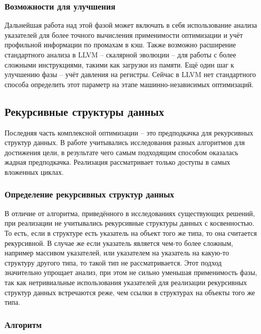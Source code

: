 \documentclass[12pt,a4paper,oneside]{article}
\begin{document}
\subsubsection{Возможности для улучшения}

\indent

Дальнейшая работа над этой фазой может включать в себя использование анализа указателей для более точного вычисления применимости оптимизации и учёт профильной информации по промахам в кэш. Также возможно расширение стандартного анализа в LLVM -- скалярной эволюции -- для работы с более сложными инструкциями, такими как загрузки из памяти. Ещё один шаг к улучшению фазы -- учёт давления на регистры. Сейчас в LLVM нет стандартного способа определить этот параметр на этапе машинно-независимых оптимизаций.

\subsection{Рекурсивные структуры данных}

\indent

Последняя часть комплексной оптимизации -- это предподкачка для рекурсивных структур данных. В работе учитывались исследования разных алгоритмов для достижения цели, в результате чего самым подходящим способом оказалась жадная предподкачка. Реализация рассматривает только доступы в самых вложенных циклах.

\subsubsection{Определение рекурсивных структур данных}

\indent

В отличие от алгоритма, приведённого в исследованиях существующих решений, при реализации не учитывались рекурсивные структуры данных с косвенностью. То есть, если в структуре есть указатель на объект того же типа, то она считается рекурсивной. В случае же если указатель является чем-то более сложным, например массивом указателей, или указателем на указатель на какую-то структуру другого типа, то такой тип не рассматривается. Этот подход значительно упрощает анализ, при этом не сильно уменьшая применимость фазы, так как нетривиальные использования указателей для реализации рекурсивных структур данных встречаются реже, чем ссылки в структурах на объекты того же типа.

\subsubsection{Алгоритм}
\end{document}
